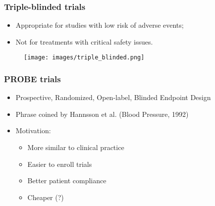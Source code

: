 \documentclass[table,10pt]{beamer}
\begin{document}
\begin{CJK*}{UTF8}{gbsn}
\begin{frame}[t]
\end{frame}


\begin{frame}[t]
\frametitle{Triple-blinded trials}
\begin{itemize}
	\item Appropriate for studies with low risk of adverse events;
	\item Not for treatments with critical safety issues.
\end{itemize}
\begin{figure}
\texttt{[image: images/triple\_blinded.png]}
\end{figure}

\end{frame}


\begin{frame}[t]
\frametitle{PROBE trials}
\begin{itemize}
	\item \alert{P}rospective, \alert{R}andomized, \alert{O}pen-label,
		\alert{B}linded \alert{E}ndpoint Design
	\item Phrase coined by Hannsson et al. (Blood Pressure, 1992)
	\item Motivation:
	\begin{itemize}
		\item More similar to clinical practice
		\item Easier to enroll trials
		\item Better patient compliance
		\item Cheaper (?)
	\end{itemize}
\end{itemize}
\end{frame}


\end{CJK*}
\end{document}
